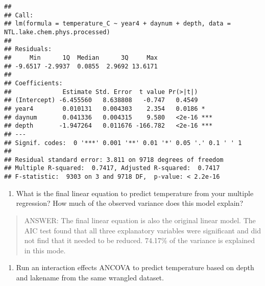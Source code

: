 \documentclass[]{article}
\newenvironment{Shaded}{\begin{snugshade}}{\end{snugshade}}
\newcommand{\KeywordTok}[1]{\textcolor[rgb]{0.13,0.29,0.53}{\textbf{#1}}}
\newcommand{\DataTypeTok}[1]{\textcolor[rgb]{0.13,0.29,0.53}{#1}}
\newcommand{\StringTok}[1]{\textcolor[rgb]{0.31,0.60,0.02}{#1}}
\newcommand{\CommentTok}[1]{\textcolor[rgb]{0.56,0.35,0.01}{\textit{#1}}}
\newcommand{\OperatorTok}[1]{\textcolor[rgb]{0.81,0.36,0.00}{\textbf{#1}}}
\newcommand{\NormalTok}[1]{#1}
\providecommand{\tightlist}{%
  \setlength{\itemsep}{0pt}\setlength{\parskip}{0pt}}
\begin{document}
\begin{verbatim}
## 
## Call:
## lm(formula = temperature_C ~ year4 + daynum + depth, data = NTL.lake.chem.phys.processed)
## 
## Residuals:
##     Min      1Q  Median      3Q     Max 
## -9.6517 -2.9937  0.0855  2.9692 13.6171 
## 
## Coefficients:
##              Estimate Std. Error  t value Pr(>|t|)    
## (Intercept) -6.455560   8.638808   -0.747   0.4549    
## year4        0.010131   0.004303    2.354   0.0186 *  
## daynum       0.041336   0.004315    9.580   <2e-16 ***
## depth       -1.947264   0.011676 -166.782   <2e-16 ***
## ---
## Signif. codes:  0 '***' 0.001 '**' 0.01 '*' 0.05 '.' 0.1 ' ' 1
## 
## Residual standard error: 3.811 on 9718 degrees of freedom
## Multiple R-squared:  0.7417, Adjusted R-squared:  0.7417 
## F-statistic:  9303 on 3 and 9718 DF,  p-value: < 2.2e-16
\end{verbatim}

\begin{enumerate}
\def\labelenumi{\arabic{enumi}.}
\setcounter{enumi}{12}
\tightlist
\item
  What is the final linear equation to predict temperature from your
  multiple regression? How much of the observed variance does this model
  explain?
\end{enumerate}

\begin{quote}
ANSWER: The final linear equation is also the original linear model. The
AIC test found that all three explanatory variables were significant and
did not find that it needed to be reduced. 74.17\% of the variance is
explained in this mode.
\end{quote}

\begin{enumerate}
\def\labelenumi{\arabic{enumi}.}
\setcounter{enumi}{13}
\tightlist
\item
  Run an interaction effects ANCOVA to predict temperature based on
  depth and lakename from the same wrangled dataset.
\end{enumerate}

\begin{Shaded}
\end{Shaded}
\end{document}
